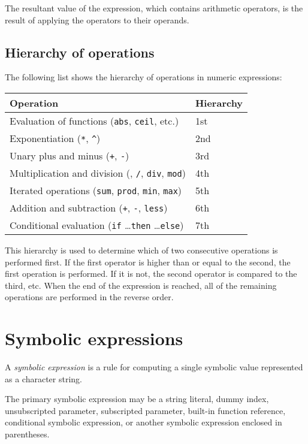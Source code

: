 \documentclass[11pt]{report}
\begin{document}
The resultant value of the expression, which contains arithmetic
operators, is the result of applying the operators to their operands.

\subsection{Hierarchy of operations}
\label{hierarchy}

The following list shows the hierarchy of operations in numeric
expressions:

\noindent\hfil
\begin{tabular}{@{}ll@{}}
Operation&Hierarchy\\
\hline
Evaluation of functions ({\tt abs}, {\tt ceil}, etc.)&1st\\
Exponentiation ({\tt**}, {\tt\textasciicircum})&2nd\\
Unary plus and minus ({\tt+}, {\tt-})&3rd\\
Multiplication and division ({\tt*}, {\tt/}, {\tt div}, {\tt mod})&4th\\
Iterated operations ({\tt sum}, {\tt prod}, {\tt min}, {\tt max})&5th\\
Addition and subtraction ({\tt+}, {\tt-}, {\tt less})&6th\\
Conditional evaluation ({\tt if} \dots {\tt then} \dots {\tt else})&
7th\\
\end{tabular}

\newpage

This hierarchy is used to determine which of two consecutive operations
is performed first. If the first operator is higher than or equal to
the second, the first operation is performed. If it is not, the second
operator is compared to the third, etc. When the end of the expression
is reached, all of the remaining operations are performed in the
reverse order.

\section{Symbolic expressions}

A {\it symbolic expression} is a rule for computing a single symbolic
value represented as a character string.

The primary symbolic expression may be a string literal, dummy index,
unsubscripted parameter, subscripted parameter, built-in function
reference, conditional symbolic expression, or another symbolic
expression enclosed in parentheses.
\end{document}
